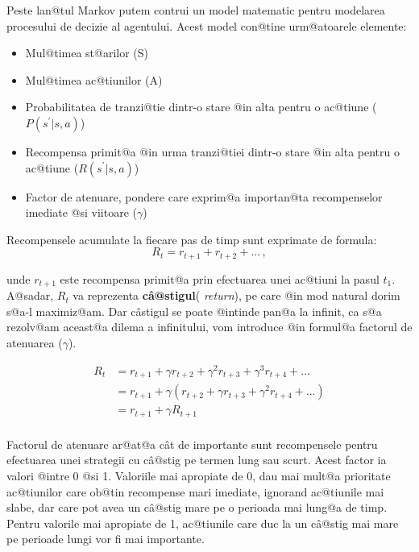 Peste lan@tul Markov putem contrui un model matematic pentru modelarea procesului de decizie al agentului. Acest model con@tine urm@atoarele elemente:

\begin{itemize}
	\item Mul@timea st@arilor (S)
	\item Mul@timea ac@tiunilor (A)
	\item Probabilitatea de tranzi@tie dintr-o stare @in alta pentru o ac@tiune ($P(s^{\prime}|s, a)$)
	\item Recompensa primit@a @in urma tranzi@tiei dintr-o stare @in alta pentru o ac@tiune ($R(s^{\prime}|s, a)$)
	\item Factor de atenuare, pondere care exprim@a importan@ta recompenselor imediate @si viitoare ($\gamma$)
\end{itemize}

Recompensele acumulate la fiecare pas de timp sunt exprimate de formula: 
\begin{equation}
	R_t = r_{t+1} + r_{t+2} + ... \,,
\end{equation}


\noindent unde $r_{t+1}$ este recompensa primit@a prin efectuarea unei ac@tiuni la pasul $t_1$. A@sadar, $R_t$ va reprezenta \textbf{c\^ a@stigul}( \textsl{return}), pe care @in mod natural dorim s@a-l maximiz@am. Dar c\^ astigul se poate @intinde pan@a la infinit, ca s@a rezolv@am aceast@a dilema a infinitului, vom introduce @in formul@a factorul de atenuarea ($\gamma$).


\begin{align}
	R_t & =  r_{t+1} + \gamma r_{t+2} + \gamma^{2} r_{t+3} + \gamma^{3} r_{t+4} + ... \\
	& =  r_{t+1} + \gamma \left( r_{t+2} + \gamma r_{t+3} + \gamma^{2} r_{t+4} + ...  \right) \\
	& =  r_{t+1} + \gamma R_{t+1} \\
\end{align}

Factorul de atenuare ar@at@a c\^ at de importante sunt recompensele pentru efectuarea unei strategii cu c\^ a@stig pe termen lung sau scurt. Acest factor ia valori @intre 0 @si 1. Valoriile mai apropiate de 0, dau mai mult@a prioritate ac@tiunilor care ob@tin recompense mari imediate, ignorand ac@tiunile mai slabe, dar care pot avea un c\^ a@stig mare pe o perioada mai lung@a de timp. Pentru valorile mai apropiate de 1, ac@tiunile care duc la un c\^ a@stig mai mare pe perioade lungi vor fi mai importante.

